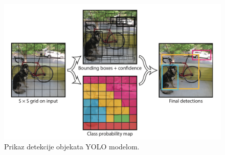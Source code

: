  \begin{figure}
	\centering
	\includegraphics[scale=0.8]{img/yolo_detekcija.png}
	\caption{Prikaz detekcije objekata YOLO modelom.}
	\label{yolo_detekcija}
\end{figure}